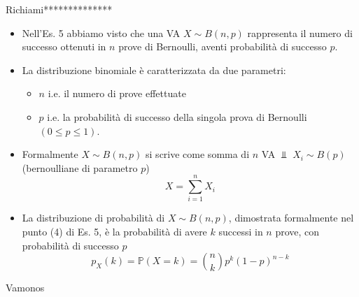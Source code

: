 Richiami**************
\begin{itemize}
\item Nell'Es. 5 abbiamo visto che una VA $X\sim B( n,p)$ rappresenta il numero di successo ottenuti in $n$ prove di Bernoulli, aventi probabilità di successo $p$.
\item La distribuzione binomiale è caratterizzata da due parametri:
\begin{itemize}
\item $n$ i.e. il numero di prove effettuate
\item $p$ i.e. la probabilità di successo della singola prova di Bernoulli $( 0\leq p\leq 1)$.
\end{itemize}
\item Formalmente $X\sim B( n,p)$ si scrive come somma di $n$ VA $\Bot $ $X_{i} \sim B( p)$ (bernoulliane di parametro $p$)\begin{equation*}
X=\sum\limits _{i=1}^{n} X_{i}
\end{equation*}
\item La distribuzione di probabilità di $X\sim B( n,p)$, dimostrata formalmente nel punto (4) di Es. 5, è la probabilità di avere $k$ successi in $n$ prove, con probabilità di successo $p$\begin{equation*}
\boxed{p_{X}( k) =\mathbb{P}( X=k) =\binom{n}{k} p^{k}( 1-p)^{n-k}}
\end{equation*}
\end{itemize}

Vamonos

